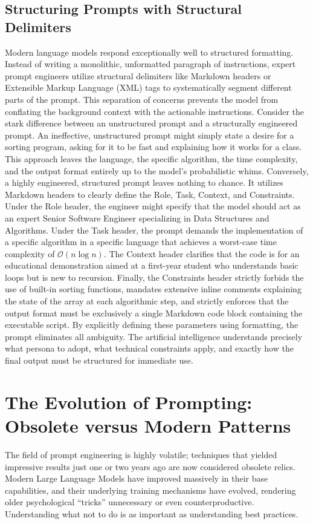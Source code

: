 \documentclass[12pt]{article}
\begin{document}
\subsection{Structuring Prompts with Structural Delimiters}
Modern language models respond exceptionally well to structured formatting. Instead of writing a monolithic,
unformatted paragraph of instructions, expert prompt engineers utilize structural delimiters like Markdown
headers or Extensible Markup Language (XML) tags to systematically segment different parts of the prompt. This
separation of concerns prevents the model from conflating the background context with the actionable
instructions. Consider the stark difference between an unstructured prompt and a structurally engineered
prompt. An ineffective, unstructured prompt might simply state a desire for a sorting program, asking for it to
be fast and explaining how it works for a class. This approach leaves the language, the specific algorithm, the
time complexity, and the output format entirely up to the model's probabilistic whims. Conversely, a highly
engineered, structured prompt leaves nothing to chance. It utilizes Markdown headers to clearly define the
Role, Task, Context, and Constraints. Under the Role header, the engineer might specify that the model should
act as an expert Senior Software Engineer specializing in Data Structures and Algorithms. Under the Task
header, the prompt demands the implementation of a specific algorithm in a specific language that achieves a
worst-case time complexity of $\mathcal{O}(n\log n)$. The Context header clarifies that the code is for an
educational demonstration aimed at a first-year student who understands basic loops but is new to
recursion. Finally, the Constraints header strictly forbids the use of built-in sorting functions, mandates
extensive inline comments explaining the state of the array at each algorithmic step, and strictly enforces
that the output format must be exclusively a single Markdown code block containing the executable script. By
explicitly defining these parameters using formatting, the prompt eliminates all ambiguity. The artificial
intelligence understands precisely what persona to adopt, what technical constraints apply, and exactly how the
final output must be structured for immediate use. 

\section{The Evolution of Prompting: Obsolete versus Modern Patterns}
The field of prompt engineering is highly
volatile; techniques that yielded impressive results just one or two years ago are now considered obsolete
relics. Modern Large Language Models have improved massively in their base capabilities, and their underlying
training mechanisms have evolved, rendering older psychological ``tricks'' unnecessary or even
counterproductive. Understanding what not to do is as important as understanding best practices. 
\end{document}
